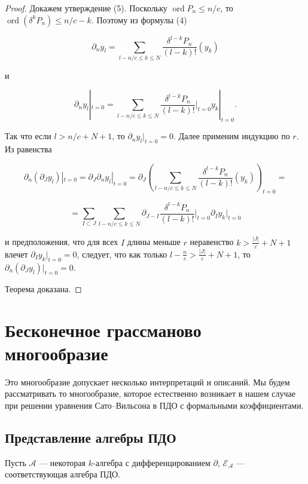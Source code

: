 \documentclass{article}
\theoremstyle{definition}
\theoremstyle{definition} %
\theoremstyle{remark}     %
\theoremstyle{definition}
\theoremstyle{definition}
\theoremstyle{definition}
\theoremstyle{definition}
\theoremstyle{definition}
\theoremstyle{definition}
\theoremstyle{definition}
\theoremstyle{definition}
\begin{document}
\begin{proof}
Докажем утверждение (5). Поскольку \(\operatorname{ord} P_n \le n/c\), то \(\operatorname{ord} (\delta^k P_n) \le n/c - k\). Поэтому из формулы (4)  

\[
\partial_n y_l = \sum_{l-n/c \le k \le N} \frac{\delta^{l-k} P_n}{(l-k)!} (y_k)
\]

и  

\[
\partial_n y_l|_{t=0} = \sum_{l-n/c \le k \le N} \frac{\delta^{l-k} P_n}{(l-k)!} \bigg|_{t=0} y_k|_{t=0}.
\]

Так что если \(l > n/c + N + 1\), то \(\partial_n y_l|_{t=0} = 0\). Далее применим индукцию по \(r\). Из равенства  

\[
\partial_n (\partial_J y_l)|_{t=0} = \partial_J \partial_n y_l|_{t=0} = \partial_J \left( \sum_{l-n/c \le k \le N} \frac{\delta^{l-k} P_n}{(l-k)!} (y_k) \right)_{t=0} =
\]

\[
= \sum_{I \subset J} \sum_{l-n/c \le k \le N} \partial_{J-I} \frac{\delta^{l-k} P_n}{(l-k)!} \bigg|_{t=0} \partial_I y_k|_{t=0}
\]

и предположения, что для всех \(I\) длины меньше \(r\) неравенство \(k > \frac{|J|}{c} + N + 1\) влечет \(\partial_I y_k|_{t=0} = 0\), следует, что как только \(l - \frac{n}{c} > \frac{|J|}{c} + N + 1\), то \(\partial_n (\partial_J y_l)|_{t=0} = 0\).


Теорема доказана.

\end{proof}












\section{Бесконечное грассманово многообразие}


Это многообразие допускает несколько интерпретаций и описаний. Мы будем рассматривать то многообразие, которое естественно возникает в нашем случае при решении уравнения Сато–Вильсона в ПДО с формальными коэффициентами.

\subsection{Представление алгебры ПДО}

Пусть \(\mathcal{A}\) — некоторая \(k\)-алгебра с дифференцированием \(\partial\), \(\mathcal{E}_\mathcal{A}\) — соответствующая алгебра ПДО.
\end{document}
